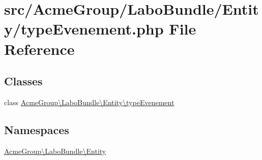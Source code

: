 \hypertarget{type_evenement_8php}{\section{src/\+Acme\+Group/\+Labo\+Bundle/\+Entity/type\+Evenement.php File Reference}
\label{type_evenement_8php}
}
\subsection*{Classes}
\begin{DoxyCompactItemize}
\item 
class \hyperlink{class_acme_group_1_1_labo_bundle_1_1_entity_1_1type_evenement}{Acme\+Group\textbackslash{}\+Labo\+Bundle\textbackslash{}\+Entity\textbackslash{}type\+Evenement}
\end{DoxyCompactItemize}
\subsection*{Namespaces}
\begin{DoxyCompactItemize}
\item 
 \hyperlink{namespace_acme_group_1_1_labo_bundle_1_1_entity}{Acme\+Group\textbackslash{}\+Labo\+Bundle\textbackslash{}\+Entity}
\end{DoxyCompactItemize}
